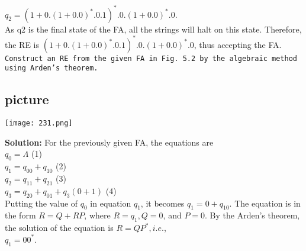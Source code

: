 \documentclass[9pt]{article}
\begin{document}
\hspace*{2.5cm} $q_2 = (1 + 0.(1 + 0.0)^*.0.1)^*.0. (1 + 0.0)^*.0.$ \\


 \hspace*{0.5cm} As q2 is the final state of the FA, all the strings will halt on this state. Therefore, the RE is $(1 + 0.
(1 + 0.0)^*.0.1)^*.0. (1 + 0.0)^*.0$, thus accepting the FA.\\

\hspace*{0.1cm} \texttt{\small{Construct an RE from the given FA in Fig. 5.2 by the algebraic method using Arden’s theorem.}} \\

\begin{center}
\section{picture}
\texttt{[image: 231.png]}
\end{center}


\textbf{Solution:} For the previously given FA, the equations are\\

\hspace*{4cm} $q_0 = \Lambda$ \hspace*{5.2cm} (1)\\
\hspace*{4cm} $q_1 = q_00 + q_10$ \hspace*{4.2cm}  (2)\\
\hspace*{4cm} $q_2 = q_11 + q_21$ \hspace*{4.1cm}  (3)\\
\hspace*{4cm} $q_3 = q_20 + q_01 + q_3 (0 + 1)$  \hspace*{2cm}   (4)\\

 \vspace*{0.1cm}
Putting the value of $q_0$ in equation $q_1$, it becomes $q_1 = 0 + q_10$. The equation is in the form $R = Q +
RP$, where $R = q_1, Q = 0$, and $P = 0$. By the Arden’s theorem, the solution of the equation is $R = QP^*, i.e.$,\\

 \vspace*{0.1cm}
\hspace*{5cm} $q_1 = 00^*$.\\
 \vspace*{0.1cm}
\end{document}
